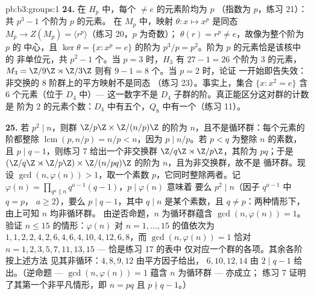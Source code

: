 \begin{solution}{pb:b3:groups:1}
\textbf{24.} 在 $H_p$ 中，每个 $\neq e$ 的元素阶均为 $p$
（指数为 $p$，练习 21）：共 $p^3 - 1$ 个阶为 $p$ 的元素。
在 $M_p$ 中，映射 $\theta \colon x \mapsto x^p$ 是同态
$M_p \to Z(M_p) = \langle r^p\rangle$（练习 20，$p$ 为奇数）；
$\theta(r) = r^p \neq e$，故像为整个阶为 $p$ 的
中心，且 $\ker\theta = \{x : x^p = e\}$ 的阶为 $p^3/p =
p^2$。阶为 $p$ 的元素恰是该核中的
非单位元，共 $p^2 - 1$ 个。当 $p = 3$ 时，$H_3$ 有
$27 - 1 = 26$ 个阶为 $3$ 的元素，$M_3 = \Z/9\Z \rtimes
\Z/3\Z$ 则有 $9 - 1 = 8$ 个。当 $p = 2$ 时，论证
一开始即告失效：非交换的 $8$ 阶群上的平方映射不是同态
（练习 23）。事实上，集合 $\{x : x^2 = e\}$
含 $6$ 个元素（位于 $D_4$ 中）--- 这一数字不是
$D_4$ 子群的阶。真正能区分这对群的计数是
阶为 $2$ 的元素个数：$D_4$ 中有五个，$Q_8$ 中有一个（练习
11）。

\textbf{25.} 若 $p^2 \mid n$，则群 $\Z/p\Z \times
\Z/(n/p)\Z$ 的阶为 $n$，且不是循环群：每个元素的
阶都整除 $\operatorname{lcm}(p, n/p) = n/p < n$，因为
$p \mid n/p$。若 $p < q$ 为整除 $n$ 的素数，且 $p \mid
q - 1$，则练习 7 给出一个非交换群 $\Z/q\Z \rtimes
\Z/p\Z$，其阶为 $pq$；于是 $(\Z/q\Z \rtimes \Z/p\Z) \times
\Z/(n/pq)\Z$ 的阶为 $n$，且为非交换群，故不是
循环群。现设 $\gcd(n, \varphi(n)) > 1$，取一个素数
$p$，它同时整除两者。记 $\varphi(n) = \prod_{q^a \parallel
n} q^{a-1}(q - 1)$，$p \mid \varphi(n)$ 意味着
要么 $p^2 \mid n$（因子 $q^{a-1}$ 中 $q = p$，
$a \geq 2$），要么 $p \mid q - 1$，其中 $q \mid n$ 是某个素数，且 $q
\neq p$：两种情形下，由上可知 $n$ 均非循环群。
由逆否命题，$n$ 为循环群蕴含 $\gcd(n, \varphi(n)) = 1$。
验证 $n \leq 15$ 的情形：$\varphi(n)$ 对 $n = 1,
\dots, 15$ 的值依次为 $1, 1, 2, 2, 4, 2, 6, 4, 6, 4, 10, 4, 12, 6,
8$，而 $\gcd(n, \varphi(n)) = 1$ 恰对 $n = 1, 2, 3, 5,
7, 11, 13, 15$ --- 恰是练习 17 的表中
仅对应一个群的各项。其余各阶按上述方法
见其非循环：$4, 8, 9, 12$ 由平方因子给出，
$6, 10, 12, 14$ 由 $2 \mid q - 1$ 给出。（逆命题 ---
$\gcd(n, \varphi(n)) = 1$ 蕴含 $n$ 为循环群 --- 亦成立；
练习 7 证明了其第一个非平凡情形，即 $n = pq$ 且
$p \nmid q - 1$。）
\end{solution}
